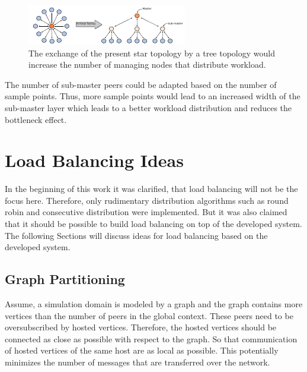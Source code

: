 \begin{figure}[H]
  \centering \includegraphics[width=\textwidth]{graphics/60_haseongpu_topology}
  \caption{The exchange of the present star topology by a tree topology
  would increase the number of managing nodes that distribute workload.}
  \label{fig:haseongpu_topology}
\end{figure}

\noindent The number of sub-master peers could be adapted based on the
number of sample points.  Thus, more sample points would lead to an
increased width of the sub-master layer which leads to a better
workload distribution and reduces the bottleneck effect.

\section{Load Balancing Ideas}

In the beginning of this work it was clarified, that load balancing
will not be the focus here. Therefore, only rudimentary
distribution algorithms such as round robin and consecutive distribution
were implemented. But it was also claimed that it should be possible
to build load balancing on top of the developed system.  The following
Sections will discuss ideas for load balancing based on the developed
system.

\subsection*{Graph Partitioning}

Assume, a simulation domain is modeled by a graph and the graph
contains more vertices than the number of peers in the global
context. These peers need to be oversubscribed by hosted vertices.
Therefore, the hosted vertices should be connected as close as
possible with respect to the graph. So that communication of hosted
vertices of the same host are as local as possible.  This potentially
minimizes the number of messages that are transferred over the
network.

